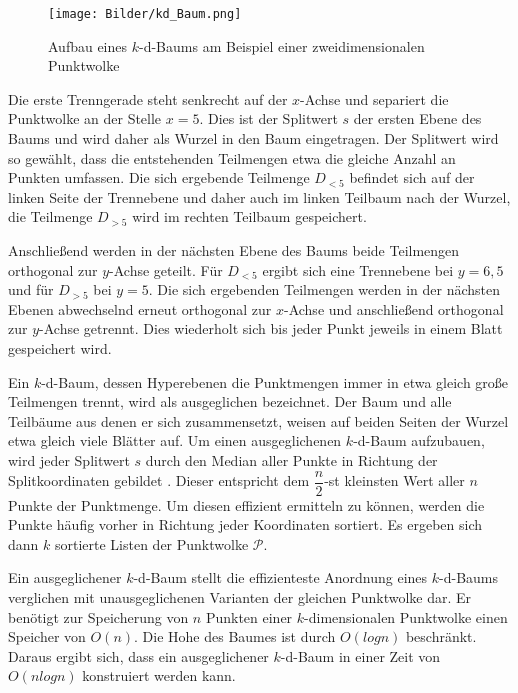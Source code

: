 \begin{figure}
    \centering
    \texttt{[image: Bilder/kd\_Baum.png]}
    \caption{Aufbau eines $k$-d-Baums am Beispiel einer zweidimensionalen Punktwolke}
    \label{fig:k-d-Baum}
\end{figure}

Die erste Trenngerade steht senkrecht auf der $x$-Achse und separiert die Punktwolke an der Stelle $ x=5 $. Dies ist der Splitwert $ s $ der ersten Ebene des Baums und wird daher als Wurzel in den Baum eingetragen. Der Splitwert wird so gewählt, dass die entstehenden Teilmengen etwa die gleiche Anzahl an Punkten umfassen. Die sich ergebende Teilmenge $ D_{<5} $ befindet sich auf der linken Seite der Trennebene und daher auch im linken Teilbaum nach der Wurzel, die Teilmenge $ D_{>5} $ wird im rechten Teilbaum gespeichert. 

Anschließend werden in der nächsten Ebene des Baums beide Teilmengen or\-tho\-go\-nal zur $y$-Achse geteilt. Für $ D_{<5} $ ergibt sich eine Trennebene bei $ y=6,5$ und für $ D_{>5} $ bei $y=5$. Die sich ergebenden Teilmengen werden in der nächsten Ebenen abwechselnd erneut orthogonal zur $x$-Achse und anschließend orthogonal zur $y$-Achse getrennt. Dies wiederholt sich bis jeder Punkt jeweils in einem Blatt gespeichert wird. 

Ein $k$-d-Baum, dessen Hyperebenen die Punktmengen immer in etwa gleich große Teilmengen trennt, wird als ausgeglichen bezeichnet. Der Baum und alle Teilbäume aus denen er sich zusammensetzt, weisen auf beiden Seiten der Wurzel etwa \linebreak gleich viele Blätter auf. Um einen ausgeglichenen $k$-d-Baum aufzubauen, wird jeder Splitwert $ s $ durch den Median aller Punkte in Richtung der Splitkoordinaten gebildet \cite{Berg2008}. Dieser entspricht dem $ \dfrac{n}{2} $-st kleinsten Wert aller $ n $ Punkte der Punktmenge. Um diesen effizient ermitteln zu können, werden die Punkte häufig vorher in Richtung jeder Koordinaten sortiert. Es ergeben sich dann $k$ sortierte Listen der Punktwolke $ \mathcal{P} $.  

Ein ausgeglichener $k$-d-Baum stellt die effizienteste Anordnung eines $k$-d-Baums verglichen mit unausgeglichenen Varianten der gleichen Punktwolke dar. Er benötigt zur Speicherung von $n$ Punkten einer $k$-dimensionalen Punktwolke einen Speicher von $ O(n) $. Die Hohe des Baumes ist durch $ O(log n) $ beschränkt. Daraus ergibt sich, dass ein ausgeglichener $k$-d-Baum in einer Zeit von $ O(n log n) $ konstruiert werden kann. 

